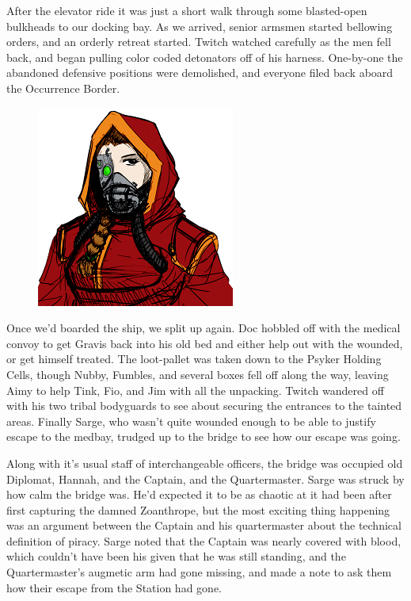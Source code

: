 After the elevator ride it was just a short walk through some blasted-open bulkheads to our docking bay. 
As we arrived, senior armsmen started bellowing orders, and an orderly retreat started. 
Twitch watched carefully as the men fell back, and began pulling color coded detonators off of his harness. 
One-by-one the abandoned defensive positions were demolished, and everyone filed back aboard the Occurrence Border.

\begin{figure}
	\begin{center}
		\includegraphics[width=\figwidth]{pics/14/49.png}
	\end{center}
\end{figure}
Once we'd boarded the ship, we split up again. 
Doc hobbled off with the medical convoy to get Gravis back into his old bed and either help out with the wounded, or get himself treated. 
The loot-pallet was taken down to the Psyker Holding Cells, though Nubby, Fumbles, and several boxes fell off along the way, leaving Aimy to help Tink, Fio, and Jim with all the unpacking. 
Twitch wandered off with his two tribal bodyguards to see about securing the entrances to the tainted areas. 
Finally Sarge, who wasn't quite wounded enough to be able to justify escape to the medbay, trudged up to the bridge to see how our escape was going.

Along with it's usual staff of interchangeable officers, the bridge was occupied old Diplomat, Hannah, and the Captain, and the Quartermaster. 
Sarge was struck by how calm the bridge was. 
He'd expected it to be as chaotic at it had been after first capturing the damned Zoanthrope, but the most exciting thing happening was an argument between the Captain and his quartermaster about the technical definition of piracy. 
Sarge noted that the Captain was nearly covered with blood, which couldn't have been his given that he was still standing, and the Quartermaster's augmetic arm had gone missing, and made a note to ask them how their escape from the Station had gone.

